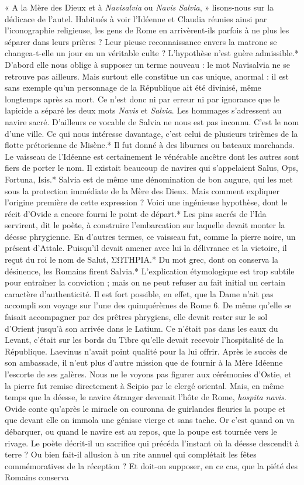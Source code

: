 \documentclass[a4paper, 11pt, oneside, polutonikogreek, french]{article}
\begin{document}
« A la Mère des Dieux et à \emph{Navisalvia} ou \emph{Navis Salvia}, » lisons-nous sur la dédicace de l'autel. Habitués à voir l'Idéenne et Claudia réunies ainsi par l'iconographie religieuse, les gens de Rome en arrivèrent-ils parfois à ne plus les séparer dans leurs prières ? Leur pieuse reconnaissance envers la matrone se changea-t-elle un jour en un véritable culte ? L'hypothèse n'est guère admissible.* D'abord elle nous oblige à supposer un terme nouveau : le mot Navisalvia ne se retrouve pas ailleurs. Mais surtout elle constitue un cas unique, anormal : il est sans exemple qu'un personnage de la République ait été divinisé, même longtemps après sa mort. Ce n'est donc ni par erreur ni par ignorance que le lapicide a séparé les deux mots \emph{Navis} et \emph{Salvia}. Les hommages s'adressent au navire sacré. D'ailleurs ce vocable de Salvia ne nous est pas inconnu. C'est le nom d'une ville. Ce qui nous intéresse davantage, c'est celui de plusieurs trirèmes de la flotte prétorienne de Misène.* Il fut donné à des liburnes ou bateaux marchands. Le vaisseau de l'Idéenne est certainement le vénérable ancêtre dont les autres sont fiers de porter le nom. Il existait beaucoup de navires qui s'appelaient Salus, Ops, Fortuna, Isis.* Salvia est de même une dénomination de bon augure, qui les met sous la protection immédiate de la Mère des Dieux. Mais comment expliquer l'origine première de cette expression ? Voici une ingénieuse hypothèse, dont le récit d'Ovide a encore fourni le point de départ.* Les pins sacrés de l'Ida servirent, dit le poète, à construire l'embarcation sur laquelle devait monter la déesse phrygienne. En d'autres termes, ce vaisseau fut, comme la pierre noire, un présent d'Attale. Puisqu'il devait amener avec lui la délivrance et la victoire, il reçut du roi le nom de Salut, ΣΩΤΗΡΙΑ.* Du mot grec, dont on conserva la désinence, les Romains firent Salvia.* L'explication étymologique est trop subtile pour entraîner la conviction ; mais on ne peut refuser au fait initial un certain caractère d'authenticité. Il est fort possible, en effet, que la Dame n'ait pas accompli son voyage sur l'une des quinquérèmes de Rome 6. De même qu'elle se faisait accompagner par des prêtres phrygiens, elle devait rester sur le sol d'Orient jusqu'à son arrivée dans le Latium. Ce n'était pas dans les eaux du Levant, c'était sur les bords du Tibre qu'elle devait recevoir l'hospitalité de la République. Laevinus n'avait point qualité pour la lui offrir. Après le succès de son ambassade, il n'eut plus d'autre mission que de fournir à la Mère Idéenne l'escorte de ses galères. Nous ne le voyons pas figurer aux cérémonies d'Ostie, et la pierre fut remise directement à Scipio par le clergé oriental. Mais, en même temps que la déesse, le navire étranger devenait l'hôte de Rome, \emph{hospita navis}. Ovide conte qu'après le miracle on couronna de guirlandes fleuries la poupe et que devant elle on immola une génisse vierge et sans tache. Or c'est quand on va débarquer, ou quand le navire est au repos, que la poupe est tournée vers le rivage. Le poète décrit-il un sacrifice qui précéda l'instant où la déesse descendit à terre ? Ou bien fait-il allusion à un rite annuel qui complétait les fêtes commémoratives de la réception ? Et doit-on supposer, en ce cas, que la piété des Romains conserva 
\end{document}
